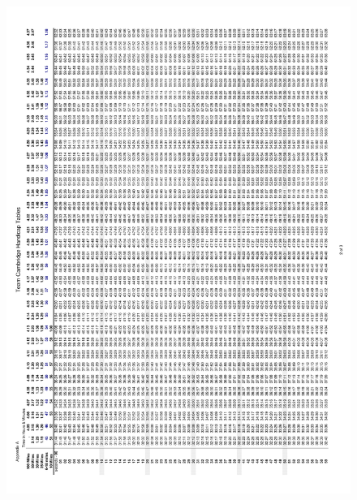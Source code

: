 \begin{figure}[H]
    \includegraphics[width=\textwidth]{./TeamCambridgeSpec/page8.pdf}
\end{figure}


